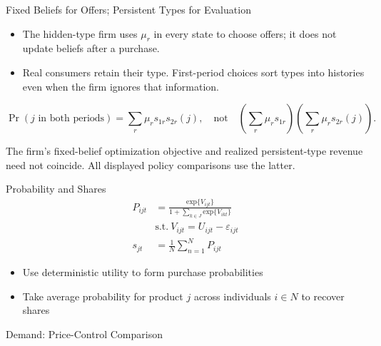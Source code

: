 \documentclass[aspectratio=169,professionalfonts]{beamer}
\newcommand{\shortbuttons}{}
\begin{document}
\gdef\shortbuttons{\hyperlink{short-20}{\beamergotobutton{Back to Household-Specific vs Common Prices}}}
\begin{frame}[label=short-54,noframenumbering]{Fixed Beliefs for Offers; Persistent Types for Evaluation}
  \begin{itemize}
    \item The hidden-type firm uses $\mu_r$ in every state to choose offers;
    it does not update beliefs after a purchase.
    \item Real consumers retain their type. First-period choices sort types into
    histories even when the firm ignores that information.
  \end{itemize}
  \[
    \Pr(j\text{ in both periods})=\sum_r\mu_r s_{1r}s_{2r}(j),
    \quad\text{not}\quad
    \left(\sum_r\mu_r s_{1r}\right)\left(\sum_r\mu_r s_{2r}(j)\right).
  \]
  \begin{tcolorbox}
    The firm's fixed-belief optimization objective and realized persistent-type
    revenue need not coincide. All displayed policy comparisons use the latter.
  \end{tcolorbox}
\end{frame}


\gdef\shortbuttons{\hyperlink{short-29}{\beamergotobutton{Back to Estimation}}}
\begin{frame}[label=short-28,noframenumbering]{Probability and Shares}
  \begin{align*}
    P_{ijt} &= \frac{\text{exp}\{V_{ijt}\}}{1 + \sum_{k\in J}\text{exp}\{V_{ikt}\}} \\
    &\text{s.t.} \ V_{ijt} = U_{ijt} - \varepsilon_{ijt} \\
    s_{jt} &= \frac{1}{N}\sum_{n=1}^{N}P_{ijt}
  \end{align*}
  \begin{itemize}
    \item Use deterministic utility to form purchase probabilities
    \item Take average probability for product $j$ across individuals $i\in N$ to recover shares
  \end{itemize}
\end{frame}


\gdef\shortbuttons{\hyperlink{short-29}{\beamergotobutton{Back to Estimation}}}
\begin{frame}[label=short-55,noframenumbering]{Demand: Price-Control Comparison}

\end{frame}
\end{document}

